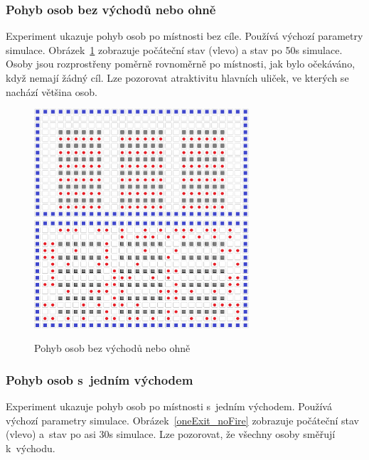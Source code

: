\documentclass[11pt, titlepage, a4paper]{article}
\begin{document}
        \subsubsection{Pohyb osob bez východů nebo ohně}
        Experiment ukazuje pohyb osob po místnosti bez cíle. Používá výchozí parametry simulace. Obrázek~\ref{noExit_noFire} zobrazuje počáteční stav (vlevo) a stav po 50s simulace. Osoby jsou rozprostřeny poměrně rovnoměrně po místnosti, jak bylo očekáváno, když nemají žádný cíl. Lze pozorovat atraktivitu hlavních uliček, ve kterých se nachází většina osob.\\

        \begin{figure}[H]
            \includegraphics[width=8cm]{gui_initial_state}
            \includegraphics[width=8cm]{TestLayouts/noExit_noFire}
            \caption{Pohyb osob bez východů nebo ohně}
            \label{noExit_noFire}
        \end{figure}

        \subsubsection{Pohyb osob s~jedním východem }
        Experiment ukazuje pohyb osob po místnosti s~jedním východem. Používá výchozí parametry simulace. Obrázek~\ref{oneExit_noFire} zobrazuje počáteční stav (vlevo) a~stav po asi 30s simulace. Lze pozorovat, že všechny osoby směřují k~východu.\\
\end{document}
